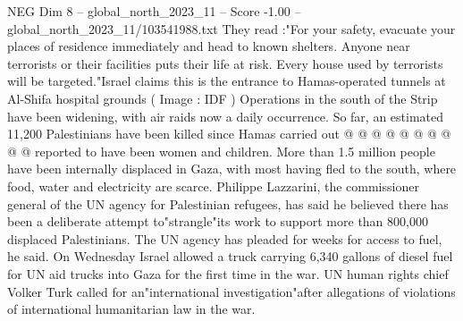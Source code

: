 \begin{textsample}{NEG Dim 8 – global\_north\_2023\_11 – Score -1.00 – global\_north\_2023\_11/103541988.txt}
They read :"For your safety, evacuate your places of residence immediately and head to known shelters.
Anyone near terrorists or their facilities puts their life at risk.
Every house used by terrorists will be targeted."Israel claims this is the entrance to Hamas-operated tunnels at Al-Shifa hospital grounds ( Image : IDF ) Operations in the south of the Strip have been widening, with air raids now a daily occurrence.
So far, an estimated 11,200 Palestinians have been killed since Hamas carried out @ @ @ @ @ @ @ @ @ @ reported to have been women and children.
More than 1.5 million people have been internally displaced in Gaza, with most having fled to the south, where food, water and electricity are scarce.
Philippe Lazzarini, the commissioner general of the UN agency for Palestinian refugees, has said he believed there has been a deliberate attempt to"strangle"its work to support more than 800,000 displaced Palestinians.
The UN agency has pleaded for weeks for access to fuel, he said.
On Wednesday Israel allowed a truck carrying 6,340 gallons of diesel fuel for UN aid trucks into Gaza for the first time in the war.
UN human rights chief Volker Turk called for an"international investigation"after allegations of violations of international humanitarian law in the war.

\end{textsample}
